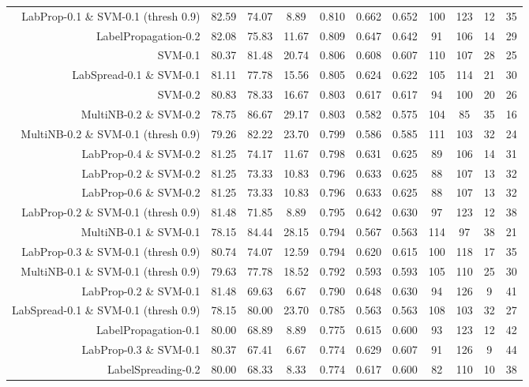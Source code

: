 \begin{table}[!htb]
\begin{tabular}{r|c|c|c|c|c|c|c|c|c|c}
LabProp-0.1 \& SVM-0.1 (thresh 0.9) & 82.59 & 74.07 & 8.89 & 0.810 & 0.662 & 0.652 & 100 & 123 & 12 & 35 \\ 
LabelPropagation-0.2 & 82.08 & 75.83 & 11.67 & 0.809 & 0.647 & 0.642 & 91 & 106 & 14 & 29 \\ 
SVM-0.1 & 80.37 & 81.48 & 20.74 & 0.806 & 0.608 & 0.607 & 110 & 107 & 28 & 25 \\ 
LabSpread-0.1 \& SVM-0.1 & 81.11 & 77.78 & 15.56 & 0.805 & 0.624 & 0.622 & 105 & 114 & 21 & 30 \\ 
SVM-0.2 & 80.83 & 78.33 & 16.67 & 0.803 & 0.617 & 0.617 & 94 & 100 & 20 & 26 \\ 
MultiNB-0.2 \& SVM-0.2 & 78.75 & 86.67 & 29.17 & 0.803 & 0.582 & 0.575 & 104 & 85 & 35 & 16 \\ 
MultiNB-0.2 \& SVM-0.1 (thresh 0.9) & 79.26 & 82.22 & 23.70 & 0.799 & 0.586 & 0.585 & 111 & 103 & 32 & 24 \\ 
LabProp-0.4 \& SVM-0.2 & 81.25 & 74.17 & 11.67 & 0.798 & 0.631 & 0.625 & 89 & 106 & 14 & 31 \\ 
LabProp-0.2 \& SVM-0.2 & 81.25 & 73.33 & 10.83 & 0.796 & 0.633 & 0.625 & 88 & 107 & 13 & 32 \\ 
LabProp-0.6 \& SVM-0.2 & 81.25 & 73.33 & 10.83 & 0.796 & 0.633 & 0.625 & 88 & 107 & 13 & 32 \\ 
LabProp-0.2 \& SVM-0.1 (thresh 0.9) & 81.48 & 71.85 & 8.89 & 0.795 & 0.642 & 0.630 & 97 & 123 & 12 & 38 \\ 
MultiNB-0.1 \& SVM-0.1 & 78.15 & 84.44 & 28.15 & 0.794 & 0.567 & 0.563 & 114 & 97 & 38 & 21 \\ 
LabProp-0.3 \& SVM-0.1 (thresh 0.9) & 80.74 & 74.07 & 12.59 & 0.794 & 0.620 & 0.615 & 100 & 118 & 17 & 35 \\ 
MultiNB-0.1 \& SVM-0.1 (thresh 0.9) & 79.63 & 77.78 & 18.52 & 0.792 & 0.593 & 0.593 & 105 & 110 & 25 & 30 \\ 
LabProp-0.2 \& SVM-0.1 & 81.48 & 69.63 & 6.67 & 0.790 & 0.648 & 0.630 & 94 & 126 & 9 & 41 \\ 
LabSpread-0.1 \& SVM-0.1 (thresh 0.9) & 78.15 & 80.00 & 23.70 & 0.785 & 0.563 & 0.563 & 108 & 103 & 32 & 27 \\ 
LabelPropagation-0.1 & 80.00 & 68.89 & 8.89 & 0.775 & 0.615 & 0.600 & 93 & 123 & 12 & 42 \\ 
LabProp-0.3 \& SVM-0.1 & 80.37 & 67.41 & 6.67 & 0.774 & 0.629 & 0.607 & 91 & 126 & 9 & 44 \\ 
LabelSpreading-0.2 & 80.00 & 68.33 & 8.33 & 0.774 & 0.617 & 0.600 & 82 & 110 & 10 & 38 \\ 

\end{tabular}
\end{table}

